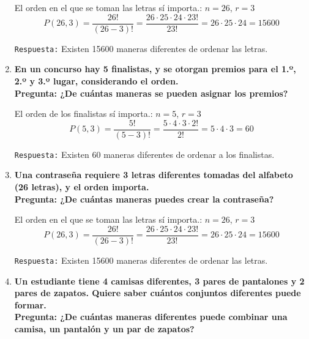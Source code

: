 \documentclass[12pt]{article}
\begin{document}
\begin{enumerate}[label=\textbf{\arabic*.}]
        El orden en el que se toman las letras sí importa.: $n = 26$, $r = 3$\\

        \[P(26, 3) = \frac{26!}{(26 - 3)!} = \frac{26\cdot 25 \cdot 24\cdot 23!}{23!} = 
        26\cdot 25\cdot 24 = 15600\]

        \texttt{Respuesta:} Existen 15600 maneras diferentes de ordenar las letras.

        
        
        \item \textbf{En un concurso hay 5 finalistas, y se otorgan premios para el 1.º, 2.º y 3.º lugar,
        considerando el orden.\\
        Pregunta: ¿De cuántas maneras se pueden asignar los premios?}

        El orden de los finalistas sí importa.: $n = 5$, $r = 3$\\

        \[P(5, 3) = \frac{5!}{(5 - 3)!} = \frac{5\cdot 4 \cdot 3\cdot 2!}{2!} = 5\cdot 4 \cdot 3 = 60\]

        \texttt{Respuesta:} Existen 60 maneras diferentes de ordenar a los finalistas.

        

        \item \textbf{Una contraseña requiere 3 letras diferentes tomadas del alfabeto (26 letras), y el
        orden importa.\\
        Pregunta: ¿De cuántas maneras puedes crear la contraseña?}

        El orden en el que se toman las letras sí importa.: $n = 26$, $r = 3$\\

        \[P(26, 3) = \frac{26!}{(26 - 3)!} = \frac{26\cdot 25 \cdot 24\cdot 23!}{23!} = 
        26\cdot 25\cdot 24 = 15600\]

        \texttt{Respuesta:} Existen 15600 maneras diferentes de ordenar las letras.


        
        \item \textbf{Un estudiante tiene 4 camisas diferentes, 3 pares de pantalones y 2 pares de
        zapatos. Quiere saber cuántos conjuntos diferentes puede formar.\\
        Pregunta: ¿De cuántas maneras diferentes puede combinar una camisa, un
        pantalón y un par de zapatos?}


\end{enumerate}
\end{document}
